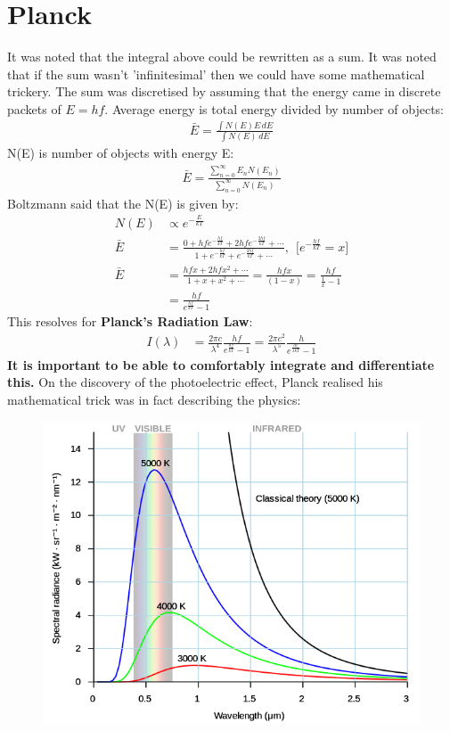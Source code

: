\documentclass[a4paper, 11pt, normalem]{report}
\begin{document}
\section{Planck}
It was noted that the integral above could be rewritten as a sum.
It was noted that if the sum wasn't 'infinitesimal' then we could have some mathematical trickery.
The sum was discretised by assuming that the energy came in discrete packets of $E = hf$.
Average energy is total energy divided by number of objects:
\begin{align}
    \bar{E} = \frac{\int N(E)E\,dE}{\int N(E)\,dE}
\end{align}
N(E) is number of objects with energy E:
\begin{align}
    \bar{E} = \frac{\sum_{n = 0}^{\infty} E_{n} N(E_{n})}{\sum_{n=0}^{\infty} N(E_{n})}
\end{align}
Boltzmann said that the N(E) is given by:
\begin{align}
    N(E) &\propto e^{-\tfrac{E}{kT}} \\
    \bar{E} &= \frac{0 + hfe^{-\tfrac{hf}{kT}} + 2hfe^{-\tfrac{2hf}{kT}} + \cdots}{1 + e^{-\tfrac{hf}{kT}} + e^{-\tfrac{2hf}{kT}} + \cdots},~~\Big[e^{-\tfrac{hf}{kT}} = x\Big]  \\
    \bar{E} &= \frac{hfx + 2hfx^{2} + \cdots}{1 + x + x^{2} + \cdots} = \frac{hfx}{(1-x)} = \frac{hf}{\tfrac{1}{x} - 1} \\
            &= \frac{hf}{e^{\tfrac{hf}{kT}} - 1}
\end{align}
This resolves for \textbf{Planck's Radiation Law}:
\begin{align}
    I(\lambda) &= \frac{2\pi c}{\lambda^{4}} \frac{hf}{e^{\tfrac{hf}{kT}} - 1} = \frac{2\pi c^{2}}{\lambda^{5}} \frac{h}{e^{\tfrac{hc}{\lambda kT}} - 1}
\end{align}
\textbf{It is important to be able to comfortably integrate and differentiate this.}
On the discovery of the photoelectric effect, Planck realised his mathematical trick was in fact describing the physics: 
\begin{figure}[H]
    \centering
    \includegraphics[scale=0.5]{Planck.png}
\end{figure}
\end{document}
